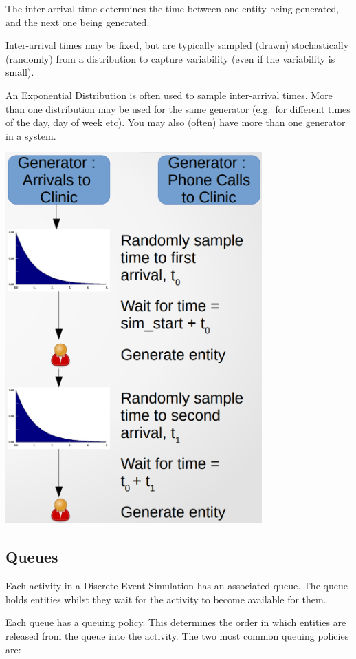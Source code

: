 \documentclass[
  letterpaper,
  DIV=11,
  numbers=noendperiod]{scrreprt}
\begin{document}
The inter-arrival time determines the time between one entity being
generated, and the next one being generated.

Inter-arrival times may be fixed, but are typically sampled (drawn)
stochastically (randomly) from a distribution to capture variability
(even if the variability is small).

An Exponential Distribution is often used to sample inter-arrival times.
More than one distribution may be used for the same generator (e.g.~for
different times of the day, day of week etc). You may also (often) have
more than one generator in a system.

\includegraphics{images/generators_iat.png}

\subsection{Queues}\label{queues}

Each activity in a Discrete Event Simulation has an associated queue.
The queue holds entities whilst they wait for the activity to become
available for them.

Each queue has a queuing policy. This determines the order in which
entities are released from the queue into the activity. The two most
common queuing policies are:
\end{document}
